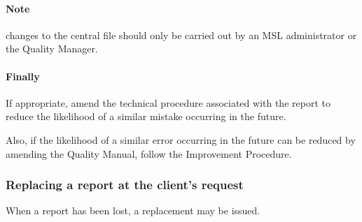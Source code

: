 {\paragraph{Note} changes to the central file should only be carried out by an MSL administrator or the Quality Manager.

\paragraph{Finally} If appropriate, amend the technical procedure associated with the report to reduce the likelihood of a similar mistake occurring in the future.

Also, if the likelihood of a similar error occurring in the future can be reduced by amending the Quality Manual, follow the Improvement Procedure.  
}



\subsubsection{Replacing a report at the client's request}
When a report has been lost, a replacement may be issued. 


